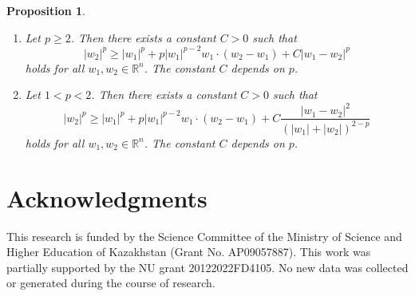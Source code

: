 \documentclass[a4paper,12pt,reqno]{amsart}
\numberwithin{equation}{section}
\theoremstyle{plain}
\newtheorem{prop}[thm]{Proposition}
\theoremstyle{definition}
\begin{document}
\begin{prop}\label{convexity inequality}\cite{Lin1990}
\begin{enumerate}[label=(\roman*)]
\item  Let $p \geq 2$. Then there exists a constant $C>0$ such that
\begin{equation}\label{convexity (a)}
|w_{2}|^{p} \geq|w_{1}|^{p}+p|w_{1}|^{p-2} w_{1} \cdot(w_{2}-w_{1})+C|w_{1}-w_{2}|^{p}
\end{equation}
holds for all $w_{1}, w_{2} \in \mathbb{R}^{n}$. The constant $C$ depends on $p$.

\item  Let $1<p<2$. Then there exists a constant $C>0$ such that
\begin{equation}\label{convexity (b)}
|w_{2}|^{p} \geq|w_{1}|^{p}+p|w_{1}|^{p-2} w_{1} \cdot(w_{2}-w_{1})+C \frac{|w_{1}-w_{2}|^{2}}{(|w_{1}|+|w_{2}|)^{2-p}} 
\end{equation}
holds  for all $w_{1}, w_{2} \in \mathbb{R}^{n}$. The constant $C$ depends on $p$.
\end{enumerate}
\end{prop}

\section{Acknowledgments}

This research is funded by the Science Committee of the Ministry of Science and Higher Education of Kazakhstan (Grant No. AP09057887). This work was partially supported by the NU grant 20122022FD4105. No new data was collected or generated during the course of research.
\end{document}
